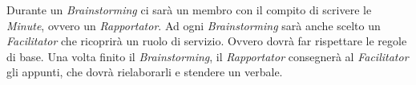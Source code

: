 \documentclass[a4paper]{report}
\begin{document}
		Durante un \emph{Brainstorming} ci sarà un membro con il compito di scrivere le \emph{Minute}, ovvero un \emph{Rapportator}. 
		Ad ogni \emph{Brainstorming} sarà anche scelto un \emph{Facilitator} che ricoprirà un ruolo di servizio. Ovvero dovrà far 
		rispettare le regole di base. Una volta finito il \emph{Brainstorming}, il \emph{Rapportator} consegnerà al \emph{Facilitator}
		gli appunti, che dovrà rielaborarli e stendere un verbale.
	
\end{document}
